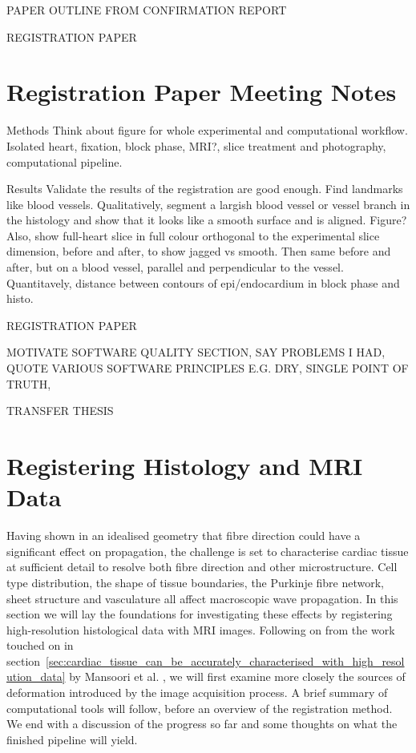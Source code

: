 PAPER OUTLINE FROM CONFIRMATION REPORT

REGISTRATION PAPER

% 
% 
\section{Registration Paper Meeting Notes}

Methods
Think about figure for whole experimental and computational workflow. Isolated heart, fixation, block phase, MRI?, slice treatment and photography, computational pipeline.

Results
Validate the results of the registration are good enough. Find landmarks like blood vessels. Qualitatively, segment a largish blood vessel or vessel branch in the histology and show that it looks like a smooth surface and is aligned. Figure? Also, show full-heart slice in full colour orthogonal to the experimental slice dimension, before and after, to show jagged vs smooth. Then same before and after, but on a blood vessel, parallel and perpendicular to the vessel. Quantitavely, distance between contours of epi/endocardium in block phase and histo.



REGISTRATION PAPER

MOTIVATE SOFTWARE QUALITY SECTION, SAY PROBLEMS I HAD, QUOTE VARIOUS SOFTWARE PRINCIPLES E.G. DRY, SINGLE POINT OF TRUTH,


TRANSFER THESIS
\section{Registering Histology and MRI Data} %

\label{cha:registering_histology_and_mri_data}
  Having shown in an idealised geometry that fibre direction could have a significant effect on propagation, the challenge is set to characterise cardiac tissue at sufficient detail to resolve both fibre direction and other microstructure. Cell type distribution, the shape of tissue boundaries, the Purkinje fibre network, sheet structure and vasculature all affect macroscopic wave propagation. In this section we will lay the foundations for investigating these effects by registering high-resolution histological data with MRI images. Following on from the work touched on in section~\ref{sec:cardiac_tissue_can_be_accurately_characterised_with_high_resolution_data} by Mansoori et al. \cite{Mansoori:2007p221}, we will first examine more closely the sources of deformation introduced by the image acquisition process. A brief summary of computational tools will follow, before an overview of the registration method. We end with a discussion of the progress so far and some thoughts on what the finished pipeline will yield.
  
